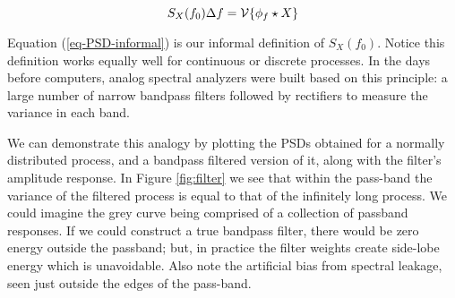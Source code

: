 \documentclass[10pt]{article}\usepackage[]{graphicx}\usepackage[]{color}
\begin{document}
\begin{equation}
\label{eq-PSD-informal}
S_X ( f_0 ) \Delta f = \mathcal{V} \{\phi_f \star X\}
\end{equation}

Equation (\ref{eq-PSD-informal}) is our informal definition of $S_X ( f_0 )$. 
Notice this definition works equally well for continuous
or discrete processes. 
In the days before computers, 
analog spectral analyzers were built based on this 
principle: a large number of narrow bandpass filters
followed by rectifiers to measure the variance in each band.

We can demonstrate this analogy by plotting the 
PSDs obtained for a normally distributed process, and
a bandpass filtered version of it, along with
the filter's amplitude response.
In Figure \ref{fig:filter} we see that
within the pass-band the variance
of the filtered process
is equal to that of the infinitely long process.
We could imagine the grey curve being comprised of a 
collection of passband responses.
If we could construct a true bandpass filter, there would be 
zero energy outside the passband; but, in practice 
the filter weights create side-lobe 
energy which is unavoidable.
Also note the artificial bias
from spectral leakage, seen just outside the 
edges of the pass-band.
%
\end{document}
